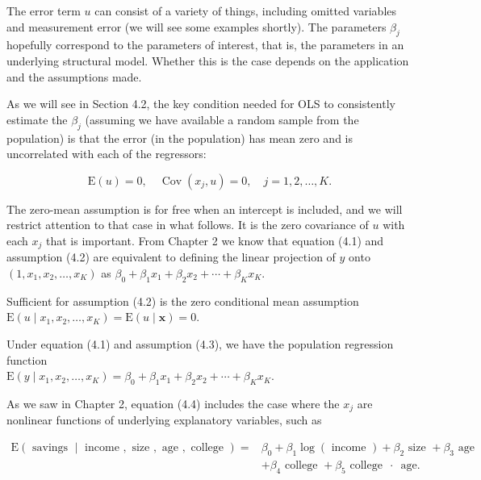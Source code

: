 \documentclass[10pt]{article}
\begin{document}
The error term $u$ can consist of a variety of things, including omitted variables and measurement error (we will see some examples shortly). The parameters $\beta_{j}$ hopefully correspond to the parameters of interest, that is, the parameters in an underlying structural model. Whether this is the case depends on the application and the assumptions made.

As we will see in Section 4.2, the key condition needed for OLS to consistently estimate the $\beta_{j}$ (assuming we have available a random sample from the population) is that the error (in the population) has mean zero and is uncorrelated with each of the regressors:


\begin{equation*}
\mathrm{E}(u)=0, \quad \operatorname{Cov}\left(x_{j}, u\right)=0, \quad j=1,2, \ldots, K . \tag{4.2}
\end{equation*}


The zero-mean assumption is for free when an intercept is included, and we will restrict attention to that case in what follows. It is the zero covariance of $u$ with each $x_{j}$ that is important. From Chapter 2 we know that equation (4.1) and assumption (4.2) are equivalent to defining the linear projection of $y$ onto $\left(1, x_{1}, x_{2}, \ldots, x_{K}\right)$ as $\beta_{0}+\beta_{1} x_{1}+\beta_{2} x_{2}+\cdots+\beta_{K} x_{K}$.

Sufficient for assumption (4.2) is the zero conditional mean assumption\\
$\mathrm{E}\left(u \mid x_{1}, x_{2}, \ldots, x_{K}\right)=\mathrm{E}(u \mid \mathbf{x})=0$.

Under equation (4.1) and assumption (4.3), we have the population regression function\\
$\mathrm{E}\left(y \mid x_{1}, x_{2}, \ldots, x_{K}\right)=\beta_{0}+\beta_{1} x_{1}+\beta_{2} x_{2}+\cdots+\beta_{K} x_{K}$.

As we saw in Chapter 2, equation (4.4) includes the case where the $x_{j}$ are nonlinear functions of underlying explanatory variables, such as

$$
\begin{aligned}
\mathrm{E}(\text { savings } \mid \text { income }, \text { size }, \text { age }, \text { college })= & \beta_{0}+\beta_{1} \log (\text { income })+\beta_{2} \text { size }+\beta_{3} \text { age } \\
& +\beta_{4} \text { college }+\beta_{5} \text { college } \text { ⋅ } \text { age. }
\end{aligned}
$$
\end{document}
